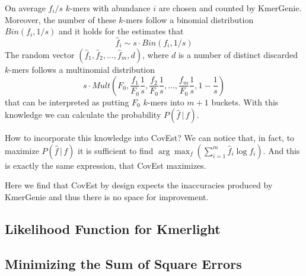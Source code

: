 On average $f_i / s$ $k$-mers with abundance $i$ are chosen and counted by KmerGenie.
Moreover, the number of these $k$-mers follow a binomial distribution $Bin(f_i, 1/s)$
and it holds for the estimates that
$$\hat f_i \sim s \cdot Bin(f_i, 1/s)$$
The random vector $(\hat f_1, \hat f_2, \dots, \hat f_m, d)$, where $d$ is a number
of distinct discarded $k$-mers follows a multinomial distribution 
$$s \cdot Mult\left(F_0, \frac{f_1}{F_0} \frac{1}{s}, \frac{f_2}{F_0} \frac{1}{s}, \dots, 
\frac{f_m}{F_0} \frac{1}{s}, 1-\frac{1}{s}\right)$$
that can be interpreted as putting $F_0$ $k$-mers into $m+1$ buckets. With this knowledge we can
calculate the probability $P(\hat f\,|\,f)$.

\medskip

How to incorporate this knowledge into CovEst? We can notice that, in fact, to maximize 
$P(\hat f\,|\,f)$ it is sufficient to find $\arg \max_f \left(\sum_{i=1}^m \hat f_i \log f_i
\right)$. And this is exactly the same expression, that CovEst maximizes.

Here we find that CovEst by design expects the inaccuracies produced by KmerGenie
and thus there is no space for improvement.

\subsection{Likelihood Function for Kmerlight}

\subsection{Minimizing the Sum of Square Errors}


